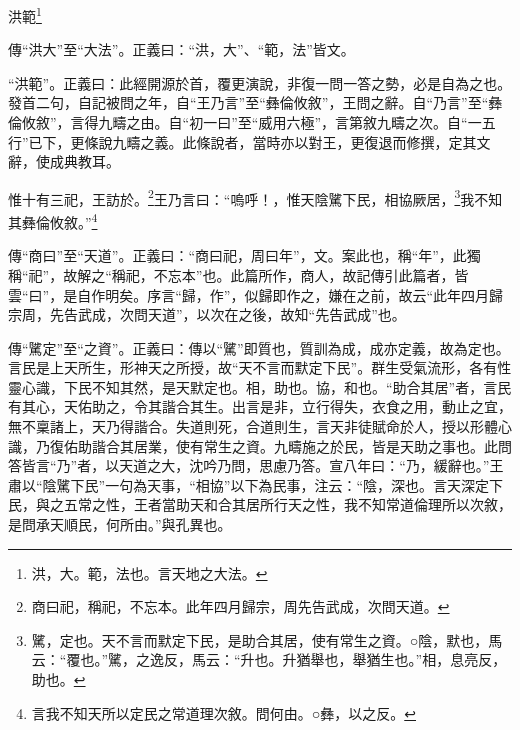 洪範\footnote{洪，大。範，法也。言天地之大法。}


{\noindent\zhuan{}\fzbyks 傳“洪大”至“大法”。正義曰：“洪，大”、“範，法”皆文。 \par}

{\noindent\shu{}\fzkt “洪範”。正義曰：此經開源於首，覆更演說，非復一問一答之勢，必是自為之也。發首二句，自記被問之年，自“王乃言”至“彝倫攸敘”，王問之辭。自“乃言”至“彝倫攸敘”，言得九疇之由。自“初一曰”至“威用六極”，言第敘九疇之次。自“一五行”已下，更條說九疇之義。此條說者，當時亦以對王，更復退而修撰，定其文辭，使成典教耳。 \par}

惟十有三祀，王訪於。\footnote{商曰祀，稱祀，不忘本。此年四月歸宗，周先告武成，次問天道。}王乃言曰：“嗚呼！，惟天陰騭下民，相協厥居，\footnote{騭，定也。天不言而默定下民，是助合其居，使有常生之資。○陰，默也，馬云：“覆也。”騭，之逸反，馬云：“升也。升猶舉也，舉猶生也。”相，息亮反，助也。}我不知其彝倫攸敘。”\footnote{言我不知天所以定民之常道理次敘。問何由。○彝，以之反。}


{\noindent\zhuan{}\fzbyks 傳“商曰”至“天道”。正義曰：“商曰祀，周曰年”，文。案此也，稱“年”，此獨稱“祀”，故解之“稱祀，不忘本”也。此篇所作，商人，故記傳引此篇者，皆雲“曰”，是自作明矣。序言“歸，作”，似歸即作之，嫌在之前，故云“此年四月歸宗周，先告武成，次問天道”，以次在之後，故知“先告武成”也。 \par}

{\noindent\zhuan{}\fzbyks 傳“騭定”至“之資”。正義曰：傳以“騭”即質也，質訓為成，成亦定義，故為定也。言民是上天所生，形神天之所授，故“天不言而默定下民”。群生受氣流形，各有性靈心識，下民不知其然，是天默定也。相，助也。協，和也。“助合其居”者，言民有其心，天佑助之，令其諧合其生。出言是非，立行得失，衣食之用，動止之宜，無不稟諸上，天乃得諧合。失道則死，合道則生，言天非徒賦命於人，授以形體心識，乃復佑助諧合其居業，使有常生之資。九疇施之於民，皆是天助之事也。此問答皆言“乃”者，以天道之大，沈吟乃問，思慮乃答。宣八年曰：“乃，緩辭也。”王肅以“陰騭下民”一句為天事，“相協”以下為民事，注云：“陰，深也。言天深定下民，與之五常之性，王者當助天和合其居所行天之性，我不知常道倫理所以次敘，是問承天順民，何所由。”與孔異也。 \par}

